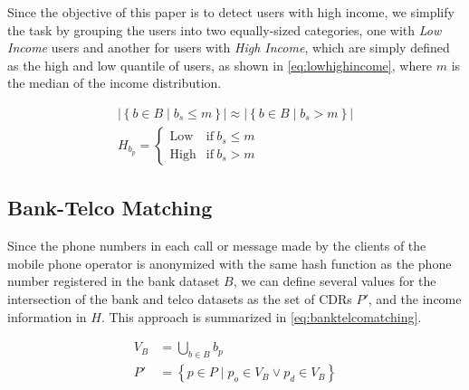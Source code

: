 Since the objective of this paper is to detect users with high income, we simplify the task by %
grouping the users into two equally-sized categories, one with \emph{Low Income} users and another for users with \emph{High Income}, which are simply defined as the high and low quantile of users, as shown in \cref{eq:lowhighincome},
where $m$ is the median of the income distribution.

\begin{equation}
\label{eq:lowhighincome}
\begin{gathered}
	\left| \left\{ b \in B \mid b_s \leq m \right\} \right| \approx \left| \left\{ b \in B \mid b_s > m \right\} \right| \\
	H_{b_p} = \begin{cases} \text{Low} & \text{if} \ b_s \leq m \\ \text{High} & \text{if} \ b_s > m \end{cases}
\end{gathered}
\end{equation}

\subsection{Bank-Telco Matching}

Since the phone numbers in each call or message made by the clients of the mobile phone operator is anonymized with the same hash function as the phone number registered in the bank dataset $B$, we can define several values for the intersection of the bank and telco datasets as the set of CDRs $P'$, and the income information in $H$. This approach is summarized in \cref{eq:banktelcomatching}.

\begin{equation}
\label{eq:banktelcomatching}
\begin{aligned}
	V_B &= \bigcup_{b \in B} b_p \\
	P' &= \left\{ p \in P \mid p_o \in V_B \lor p_d \in V_B \right\}
\end{aligned}
\end{equation}

